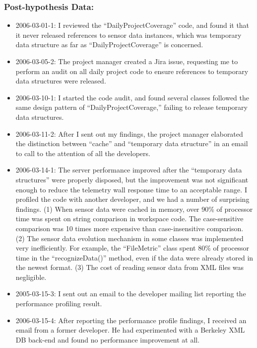 \subsubsection{Post-hypothesis Data:}
\begin{itemize}
  \setlength{\itemsep}{0pt}
  \setlength{\parskip}{0pt}
  \item 2006-03-01-1: I reviewed the ``DailyProjectCoverage'' code, and found it that it never released references to sensor data instances, which was temporary data structure as far as ``DailyProjectCoverage'' is concerned. 
  \item 2006-03-05-2: The project manager created a Jira issue, requesting me to perform an audit on all daily project code to ensure references to temporary data structures were released.
  \item 2006-03-10-1: I started the code audit, and found several classes followed the same design pattern of ``DailyProjectCoverage,'' failing to release temporary data structures.
  \item 2006-03-11-2: After I sent out my findings, the project manager elaborated the distinction between ``cache'' and ``temporary data structure'' in an email to call to the attention of all the developers. 
  \item 2006-03-14-1: The server performance improved after the ``temporary data structures'' were properly disposed, but the improvement was not significant enough to reduce the telemetry wall response time to an acceptable range. I profiled the code with another developer, and we had a number of surprising findings. (1) When sensor data were cached in memory, over 90\% of processor time was spent on string comparison in workspace code. The case-sensitive comparison was 10 times more expensive than case-insensitive comparison. (2) The sensor data evolution mechanism in some classes was implemented very inefficiently. For example, the ``FileMetric'' class spent 80\% of processor time in the ``recognizeData()'' method, even if the data were already stored in the newest format. (3) The cost of reading sensor data from XML files was negligible.

  \item 2005-03-15-3: I sent out an email to the developer mailing list reporting the performance profiling result.

  \item 2006-03-15-4: After reporting the performance profile findings, I received an email from a former developer. He had experimented with a Berkeley XML DB back-end and found no performance improvement at all.


\end{itemize}
